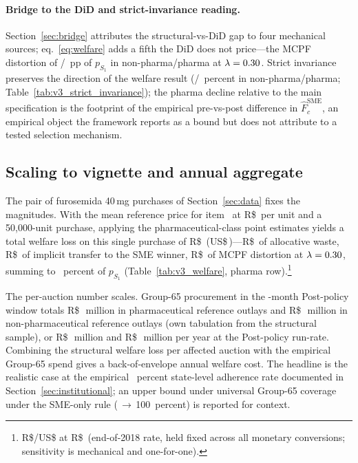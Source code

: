 \paragraph{Bridge to the DiD and strict-invariance reading.} Section~\ref{sec:bridge} attributes the structural-vs-DiD gap to four mechanical sources; eq.~\eqref{eq:welfare} adds a fifth the DiD does not price---the MCPF distortion of \mcpfContribNpPp{}/\mcpfContribPhPp~pp of $p_{S_1}$ in non-pharma/pharma at $\lambda = 0.30$. Strict invariance preserves the direction of the welfare result (\siWelfLossPctNp{}/\siWelfLossPctPh~percent in non-pharma/pharma; Table~\ref{tab:v3_strict_invariance}); the pharma decline relative to the main specification is the footprint of the empirical pre-vs-post difference in $\hat F_c^{\text{SME}}$, an empirical object the framework reports as a bound but does not attribute to a tested selection mechanism.

\subsection{Scaling to vignette and annual aggregate}\label{sec:annual_aggregate}

The pair of furosemida 40\,mg purchases of Section~\ref{sec:data} fixes the magnitudes. With the mean reference price for item~\furosItemId{} at R\$\,\furosUnitPriceBRL{} per unit and a 50{,}000-unit purchase, applying the pharmaceutical-class point estimates yields a total welfare loss on this single purchase of R\$\,\furosTotalLossBRL{} (US\$\,\furosTotalLossUSD)---R\$\,\furosDwlBRL{} of allocative waste, R\$\,\furosTransferBRL{} of implicit transfer to the SME winner, R\$\,\furosMcpfBRL{} of MCPF distortion at $\lambda = 0.30$, summing to \welfLossPctLthirtyPh~percent of $p_{S_1}$ (Table~\ref{tab:v3_welfare}, pharma row).\footnote{R\$/US\$ at R\$\,\fxRate{} (end-of-2018 rate, held fixed across all monetary conversions; sensitivity is mechanical and one-for-one).}

The per-auction number scales. Group-65 procurement in the \structuralWindowM-month Post-policy window totals R\$\,\welfRefOutlayPharma~million in pharmaceutical reference outlays and R\$\,\welfRefOutlayNp~million in non-pharmaceutical reference outlays (own tabulation from the structural sample), or R\$\,\welfRefOutlayPharmaYr~million and R\$\,\welfRefOutlayNpYr~million per year at the Post-policy run-rate. Combining the structural welfare loss per affected auction with the empirical Group-65 spend gives a back-of-envelope annual welfare cost. The headline is the realistic case at the empirical \adherenceGsixtyfivePost~percent state-level adherence rate documented in Section~\ref{sec:institutional}; an upper bound under universal Group-65 coverage under the SME-only rule (\adherenceGsixtyfivePost{}\,$\to$\,100~percent) is reported for context.

